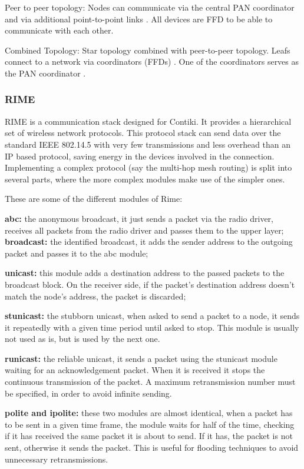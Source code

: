 Peer to peer topology:
	Nodes can communicate via the central PAN coordinator and via additional point-to-point links .
All devices are FFD to be able to communicate with each other.


Combined Topology:
	Star topology combined with peer-to-peer topology.
Leafs connect to a network via coordinators (FFDs) .
One of the coordinators serves as the PAN coordinator .


\subsubsection{RIME}

RIME is a communication stack designed for Contiki.
It provides a hierarchical set of wireless network protocols.
This protocol stack can send data over the standard IEEE 802.14.5 with very few transmissions and less overhead than an IP based protocol,
	saving energy in the devices involved in the connection.
Implementing a complex protocol (say the multi-hop mesh routing) is split into several parts,
	where the more complex modules make use of the simpler ones.


These are some of the different modules of Rime:

\textbf{abc:} the anonymous broadcast,
	it just sends a packet via the radio driver,
	receives all packets from the radio driver and passes them to the upper layer; 
\textbf{broadcast:} the identified broadcast, it adds the sender address to the outgoing
packet and passes it to the abc module;

\textbf{unicast:} this module adds a destination address to the passed packets to the broadcast block.
On the receiver side,
	if the packet's destination address doesn't match the node's address, the packet is discarded;

\textbf{stunicast:} the stubborn unicast,
	when asked to send a packet to a node,
	it sends it repeatedly with a given time period until asked to stop.
This module is usually not used as is,
	but is used by the next one.

\textbf{runicast:} the reliable unicast,
	it sends a packet using the stunicast module waiting for an acknowledgement packet.
When it is received it stops the continuous transmission of the packet.
A maximum retransmission number must be specified,
	in order to avoid infinite sending.

\textbf{polite and ipolite:} these two modules are almost identical,
	when a packet has to be sent in a given time frame,
	the module waits for half of the time,
	checking if it has received the same packet it is about to send.
If it has,
	the packet is not sent,
	otherwise it sends the packet.
This is useful for flooding techniques to avoid unnecessary retransmissions.


